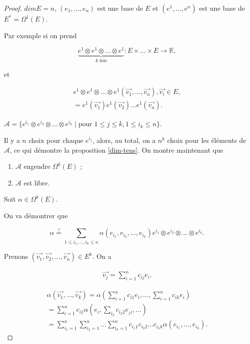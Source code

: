 \documentclass[french]{article}
\theoremstyle{definition}
\theoremstyle{remark}
\begin{document}
\begin{proof}
  $dim E = n$, $(e_1, \dots, e_n)$ est une base de $E$ et $(e ^{1}, \dots, e ^{n})$ est une base de $E ^{*} = \Omega ^{1}(E)$.

  Par exemple si on prend

  \[
  \underbrace{e^{1} \otimes e ^{1} \otimes \dots \otimes e ^{1}}_{k \text{ fois} } : E \times \dots \times E \to \mathbb{R},
  \]

  et

  \begin{gather*}
    e^{1} \otimes e ^{1} \otimes \dots \otimes e ^{1}(\overrightarrow{ v_1 }, \dots, \overrightarrow{ v_n }  ), \overrightarrow{ v_i } \in E, \\
    = e ^{1}(\overrightarrow{ v_1 } ) e ^{1}(\overrightarrow{ v_2 } ) \dots e ^{1}(\overrightarrow{ v_n }).
  \end{gather*}

  $\mathscr{A} = \{ e ^{i_1} \otimes e ^{i_2} \otimes \dots \otimes e ^{i_k} \mid \text{pour } 1 \leq j \leq k, 1 \leq i_k \leq n  \} $.

  Il y a $n$ choix pour chaque $e ^{i_j}$, alors, au total, on a $n ^k$ choix pour les éléments de $\mathscr{A} $, ce qui démontre la proposition \ref{dim-tens}. On montre maintenant que

  \begin{enumerate}
    \item $\mathscr{A} $ engendre $\Omega ^{k}(E)$ ;
    \item $\mathscr{A} $ est libre.
  \end{enumerate}

  Soit $\alpha \in \Omega ^{k}(E)$.

  On va démontrer que

  \[
  \alpha \stackrel{?}{=} \sum_{1 \leq i_1, \dots, i_k \leq n}^{} \alpha(e _{i_1}, e _{i_2}, \dots, e _{i_k}) e ^{i_1} \otimes e ^{i_2} \otimes \dots \otimes e ^{i_k}.
  \]

  Prenons $(\overrightarrow{ v_1 }, \overrightarrow{ v_2 }, \dots, \overrightarrow{ v_n }) \in E ^{k}$. On a

  \begin{gather*}
    \overrightarrow{ v_j } = \sum_{i=1}^{n} c _{ij} e_i.
  \end{gather*}

  \begin{gather*}
    \alpha(\overrightarrow{ v_1 }, \dots, \overrightarrow{ v_k }) = \alpha\left(\sum_{i=1}^{n}c _{i1}e_i, \dots, \sum_{i=1}^{n} c _{ik} e_i\right) \\
    = \sum_{i=1}^{n} c _{i1} \alpha\left(e_i, \sum_{i_2}^{} c _{i_2 2} e _{_2 i}, \dots  \right)  \\
    = \sum_{i_1 =1}^{n} \sum_{i_2=1}^{n} \dots \sum_{i_k=1}^{n} c _{i_1 1} c _{i_2 2} \dots c _{i_k k} \alpha(e _{i_1},\dots, e _{i_k}).
  \end{gather*}


\end{proof}
\end{document}
